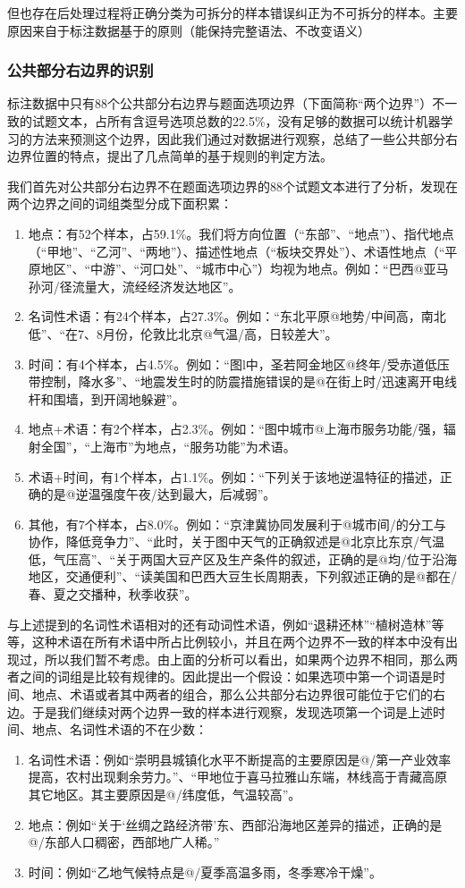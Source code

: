 \documentclass[master, winfont]{njuthesis}
\begin{document}
但也存在后处理过程将正确分类为可拆分的样本错误纠正为不可拆分的样本。主要原因来自于标注数据基于的原则（能保持完整语法、不改变语义）

\subsubsection{公共部分右边界的识别}
\label{boundary_rec}
标注数据中只有88个公共部分右边界与题面选项边界（下面简称“两个边界”）不一致的试题文本，占所有含逗号选项总数的22.5\%，没有足够的数据可以统计机器学习的方法来预测这个边界，因此我们通过对数据进行观察，总结了一些公共部分右边界位置的特点，提出了几点简单的基于规则的判定方法。

我们首先对公共部分右边界不在题面选项边界的88个试题文本进行了分析，发现在两个边界之间的词组类型分成下面积累：
\begin{enumerate}
	\item 地点：有52个样本，占59.1\%。我们将方向位置（“东部”、“地点”）、指代地点（“甲地”、“乙河”、“两地”）、描述性地点（“板块交界处”）、术语性地点（“平原地区”、“中游”、“河口处”、“城市中心”）均视为地点。例如：“巴西@亚马孙河/径流量大，流经经济发达地区”。
	\item 名词性术语：有24个样本，占27.3\%。例如：“东北平原@地势/中间高，南北低”、“在7、8月份，伦敦比北京@气温/高，日较差大”。
	\item 时间：有4个样本，占4.5\%。例如：“图l中，圣若阿金地区@终年/受赤道低压带控制，降水多”、“地震发生时的防震措施错误的是@在街上时/迅速离开电线杆和围墙，到开阔地躲避”。
	\item 地点+术语：有2个样本，占2.3\%。例如：“图中城市@上海市服务功能/强，辐射全国”，“上海市”为地点，“服务功能”为术语。
	\item 术语+时间，有1个样本，占1.1\%。例如：“下列关于该地逆温特征的描述，正确的是@逆温强度午夜/达到最大，后减弱”。
	\item 其他，有7个样本，占8.0\%。例如：“京津冀协同发展利于@城市间/的分工与协作，降低竞争力”、“此时，关于图中天气的正确叙述是@北京比东京/气温低，气压高”、“关于两国大豆产区及生产条件的叙述，正确的是@均/位于沿海地区，交通便利”、“读美国和巴西大豆生长周期表，下列叙述正确的是@都在/春、夏之交播种，秋季收获”。
\end{enumerate}

与上述提到的名词性术语相对的还有动词性术语，例如“退耕还林”“植树造林”等等，这种术语在所有术语中所占比例较小，并且在两个边界不一致的样本中没有出现过，所以我们暂不考虑。由上面的分析可以看出，如果两个边界不相同，那么两者之间的词组是比较有规律的。因此提出一个假设：如果选项中第一个词语是时间、地点、术语或者其中两者的组合，那么公共部分右边界很可能位于它们的右边。于是我们继续对两个边界一致的样本进行观察，发现选项第一个词是上述时间、地点、名词性术语的不在少数：
\begin{enumerate}
	\item 名词性术语：例如“崇明县城镇化水平不断提高的主要原因是@/第一产业效率提高，农村出现剩余劳力。”、“甲地位于喜马拉雅山东端，林线高于青藏高原其它地区。其主要原因是@/纬度低，气温较高”。
	\item 地点：例如“关于‘丝绸之路经济带’东、西部沿海地区差异的描述，正确的是@/东部人口稠密，西部地广人稀。”
	\item 时间：例如“乙地气候特点是@/夏季高温多雨，冬季寒冷干燥”。
\end{enumerate}
\end{document}
